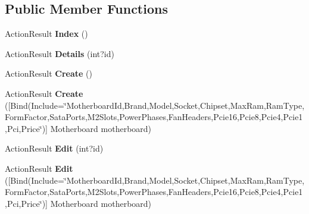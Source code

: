 \subsection*{Public Member Functions}
\begin{DoxyCompactItemize}
\item 
Action\+Result {\bfseries Index} ()\hypertarget{class_p_c_builder_m_v_c_1_1_controllers_1_1_motherboard_controller_aa2a0f0e9dcb1ed08d282201866a6be89}{}\label{class_p_c_builder_m_v_c_1_1_controllers_1_1_motherboard_controller_aa2a0f0e9dcb1ed08d282201866a6be89}

\item 
Action\+Result {\bfseries Details} (int?id)\hypertarget{class_p_c_builder_m_v_c_1_1_controllers_1_1_motherboard_controller_a727538002744452af952b885559e9d8b}{}\label{class_p_c_builder_m_v_c_1_1_controllers_1_1_motherboard_controller_a727538002744452af952b885559e9d8b}

\item 
Action\+Result {\bfseries Create} ()\hypertarget{class_p_c_builder_m_v_c_1_1_controllers_1_1_motherboard_controller_abf7fa94ab1c69180e7976fb1cbf346bc}{}\label{class_p_c_builder_m_v_c_1_1_controllers_1_1_motherboard_controller_abf7fa94ab1c69180e7976fb1cbf346bc}

\item 
Action\+Result {\bfseries Create} (\mbox{[}Bind(Include=\char`\"{}Motherboard\+Id,Brand,Model,Socket,Chipset,Max\+Ram,Ram\+Type,Form\+Factor,Sata\+Ports,M2\+Slots,Power\+Phases,Fan\+Headers,Pcie16,Pcie8,Pcie4,Pcie1,Pci,Price\char`\"{})\mbox{]} Motherboard motherboard)\hypertarget{class_p_c_builder_m_v_c_1_1_controllers_1_1_motherboard_controller_a027a5f5735442481b44fd9b9bcde781e}{}\label{class_p_c_builder_m_v_c_1_1_controllers_1_1_motherboard_controller_a027a5f5735442481b44fd9b9bcde781e}

\item 
Action\+Result {\bfseries Edit} (int?id)\hypertarget{class_p_c_builder_m_v_c_1_1_controllers_1_1_motherboard_controller_adb4e93d677b42cbdfbb18eaecb4d86e2}{}\label{class_p_c_builder_m_v_c_1_1_controllers_1_1_motherboard_controller_adb4e93d677b42cbdfbb18eaecb4d86e2}

\item 
Action\+Result {\bfseries Edit} (\mbox{[}Bind(Include=\char`\"{}Motherboard\+Id,Brand,Model,Socket,Chipset,Max\+Ram,Ram\+Type,Form\+Factor,Sata\+Ports,M2\+Slots,Power\+Phases,Fan\+Headers,Pcie16,Pcie8,Pcie4,Pcie1,Pci,Price\char`\"{})\mbox{]} Motherboard motherboard)\hypertarget{class_p_c_builder_m_v_c_1_1_controllers_1_1_motherboard_controller_a05911fe623774ee2dcbd9bf1079aaf2e}{}\label{class_p_c_builder_m_v_c_1_1_controllers_1_1_motherboard_controller_a05911fe623774ee2dcbd9bf1079aaf2e}


\end{DoxyCompactItemize}
